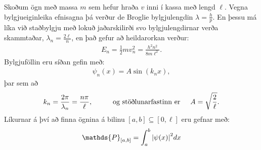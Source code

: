 \begin{tcolorbox}
Skoðum ögn með massa $m$ sem hefur hraða $v$ inni í kassa með lengd $\ell$. Vegna bylgjueiginleika efnisagna þá verður de Broglie bylgjulengdin $\lambda = \frac{h}{p}$. En þessu má líka við staðbylgju með lokuð jaðarskilirði svo bylgjulengdirnar verða skammtaðar, $\lambda_n = \frac{2 \ell}{n}$, en það gefur að heildarorkan verður:
\begin{align*}
    E_n = \frac{1}{2}mv_n^2  = \frac{h^2 n^2}{8m\ell^2}.
\end{align*}
Bylgjuföllin eru síðan gefin með:
\vspace{-0.6cm}
\begin{align*}
    \psi_n(x) = A\sin(k_n x),
\end{align*}
þar sem að 
\vspace{-0.4cm}
\begin{align*}
     k_n = \frac{2\pi}{\lambda_n} = \frac{n\pi}{\ell}, \hspace{1cm} \text{og stöðlunarfastinn er} \hspace{0.5cm} A = \sqrt{\frac{2}{\ell}}.
\end{align*}
Líkurnar á því að finna ögnina á bilinu $[a,b] \subseteq [0,\ell]$ eru gefnar með:
\begin{align*}
    \mathds{P}_{[a,b]} = \int_{a}^{b} \abs{\psi(x)}^2 dx
\end{align*}
\end{tcolorbox}

